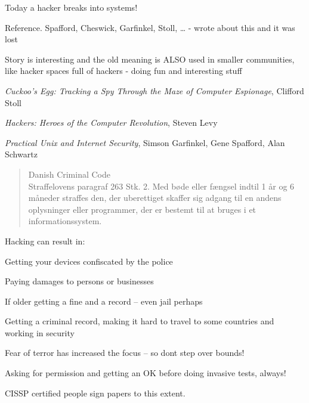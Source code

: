 \documentclass[Screen16to9,17pt]{foils}
\begin{document}
{\color{red}\hlkbig Today a hacker breaks into systems!}

Reference. Spafford, Cheswick, Garfinkel, Stoll, \ldots
- wrote about this and it was lost

Story is interesting and the old meaning is ALSO used in smaller communities, like hacker spaces full of hackers - doing fun and interesting stuff
\begin{list2}
\item \emph{Cuckoo's Egg: Tracking a Spy Through the Maze of Computer
 Espionage},  Clifford Stoll
\item \emph{Hackers: Heroes of the Computer Revolution},
Steven Levy
\item \emph{Practical Unix and Internet Security},
Simson Garfinkel, Gene Spafford, Alan Schwartz
\end{list2}


\begin{quote}\small
Danish Criminal Code\\
Straffelovens paragraf 263 Stk. 2. Med bøde eller fængsel indtil 1 år og 6 måneder straffes den, der uberettiget skaffer sig adgang til en andens oplysninger eller programmer, der er bestemt til at bruges i et informationssystem.
\end{quote}

Hacking can result in:
\begin{list2}
\item Getting your devices confiscated by the police
\item Paying damages to persons or businesses
\item If older getting a fine and a record -- even jail perhaps
\item Getting a criminal record, making it hard to travel to some countries and working in security
\item Fear of terror has increased the focus -- so dont step over bounds!
\end{list2}

Asking for permission and getting an OK before doing invasive tests, always!



CISSP certified people sign papers to this extent.\\


\end{document}

